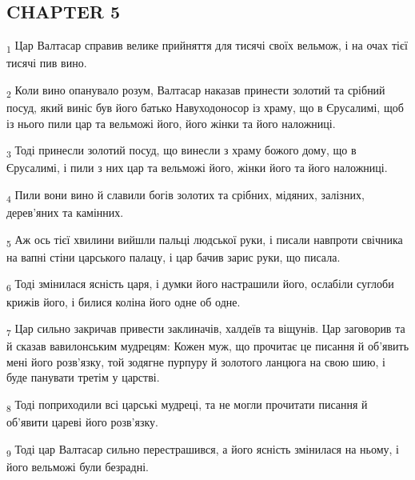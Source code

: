 \subsection{CHAPTER 5}
\begin{tcolorbox}
\textsubscript{1} Цар Валтасар справив велике прийняття для тисячі своїх вельмож, і на очах тієї тисячі пив вино.
\end{tcolorbox}
\begin{tcolorbox}
\textsubscript{2} Коли вино опанувало розум, Валтасар наказав принести золотий та срібний посуд, який виніс був його батько Навуходоносор із храму, що в Єрусалимі, щоб із нього пили цар та вельможі його, його жінки та його наложниці.
\end{tcolorbox}
\begin{tcolorbox}
\textsubscript{3} Тоді принесли золотий посуд, що винесли з храму божого дому, що в Єрусалимі, і пили з них цар та вельможі його, жінки його та його наложниці.
\end{tcolorbox}
\begin{tcolorbox}
\textsubscript{4} Пили вони вино й славили богів золотих та срібних, мідяних, залізних, дерев'яних та камінних.
\end{tcolorbox}
\begin{tcolorbox}
\textsubscript{5} Аж ось тієї хвилини вийшли пальці людської руки, і писали навпроти свічника на вапні стіни царського палацу, і цар бачив зарис руки, що писала.
\end{tcolorbox}
\begin{tcolorbox}
\textsubscript{6} Тоді змінилася ясність царя, і думки його настрашили його, ослабіли суглоби крижів його, і билися коліна його одне об одне.
\end{tcolorbox}
\begin{tcolorbox}
\textsubscript{7} Цар сильно закричав привести заклиначів, халдеїв та віщунів. Цар заговорив та й сказав вавилонським мудрецям: Кожен муж, що прочитає це писання й об'явить мені його розв'язку, той зодягне пурпуру й золотого ланцюга на свою шию, і буде панувати третім у царстві.
\end{tcolorbox}
\begin{tcolorbox}
\textsubscript{8} Тоді поприходили всі царські мудреці, та не могли прочитати писання й об'явити цареві його розв'язку.
\end{tcolorbox}
\begin{tcolorbox}
\textsubscript{9} Тоді цар Валтасар сильно перестрашився, а його ясність змінилася на ньому, і його вельможі були безрадні.
\end{tcolorbox}
